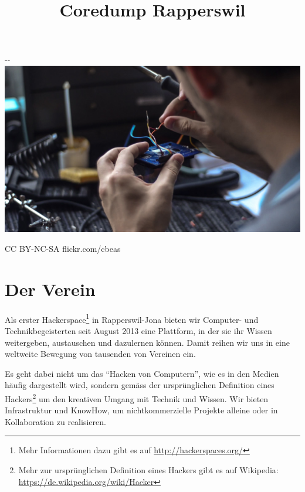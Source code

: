 \documentclass[10pt,a4paper,parskip,fleqn]{scrartcl}
\title{\Huge Coredump Rapperswil}
\begin{document}
\begin{titlepage}

	\maketitle

	\vspace{2cm}

	\begin{adjustwidth}{-\oddsidemargin-1in}{-\rightmargin-1in}
		\includegraphics[width=\paperwidth]{img/soldering.jpg}

		\vspace{-12mm}

		\hfill {\scriptsize \color{light-gray} CC BY-NC-SA flickr.com/cbeas}
	\end{adjustwidth}

	\vfill

\end{titlepage}

\section{Der Verein}

Als erster Hackerspace\footnote{Mehr Informationen dazu gibt es auf
\url{http://hackerspaces.org/}} in Rapperswil-Jona bieten wir Computer- und
Technikbegeisterten seit August 2013 eine Plattform, in der sie ihr Wissen
weitergeben, austauschen und dazulernen können. Damit reihen wir uns in eine
weltweite Bewegung von tausenden von Vereinen ein.

Es geht dabei nicht um das ``Hacken von Computern'', wie es in den Medien häufig
dargestellt wird, sondern gemäss der ursprünglichen Definition eines
Hackers\footnote{Mehr zur ursprünglichen Definition eines Hackers gibt es auf
Wikipedia: \url{https://de.wikipedia.org/wiki/Hacker}} um den kreativen Umgang
mit Technik und Wissen. Wir bieten Infrastruktur und KnowHow, um
nichtkommerzielle Projekte alleine oder in Kollaboration zu realisieren.
\end{document}
